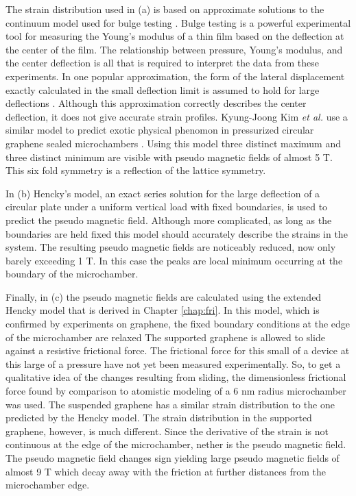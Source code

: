 The strain distribution used in (a) is based on approximate solutions to the continuum model used for bulge testing \cite{Timoshenko}.
Bulge testing is a powerful experimental tool for measuring the Young's modulus of a thin film based on the deflection at the center of the film.
The relationship between pressure, Young's modulus, and the center deflection is all that is required to interpret the data from these experiments.
In one popular approximation, the form of the lateral displacement exactly calculated in the small deflection limit is assumed to hold for large deflections \cite{Timoshenko}. 
Although this approximation correctly describes the center deflection, it does not give accurate strain profiles.
Kyung-Joong Kim \emph{et al.} use a similar model to predict exotic physical phenomon in pressurized circular graphene sealed microchambers \cite{Kim2011b}.
Using this model three distinct maximum and three distinct minimum are visible with pseudo magnetic fields of almost 5 T.
This six fold symmetry is a reflection of the lattice symmetry.

In (b) Hencky's model, an exact series solution for the large deflection of a circular plate under a uniform vertical load with fixed boundaries, is used to predict the pseudo magnetic field.
Although more complicated, as long as the boundaries are held fixed this model should accurately describe the strains in the system.
The resulting pseudo magnetic fields are noticeably reduced, now only barely exceeding 1 T.
In this case the peaks are local minimum occurring at the boundary of the microchamber.

Finally, in (c) the pseudo magnetic fields are calculated using the extended Hencky model that is derived in Chapter \ref{chap:fri}.
In this model, which is confirmed by experiments on graphene, the fixed boundary conditions at the edge of the microchamber are relaxed
The supported graphene is allowed to slide against a resistive frictional force.
The frictional force for this small of a device at this large of a pressure have not yet been measured experimentally.
So, to get a qualitative idea of the changes resulting from sliding, the dimensionless frictional force found by comparison to atomistic modeling of a 6 nm radius microchamber was used.
The suspended graphene has a similar strain distribution to the one predicted by the Hencky model.
The strain distribution in the supported graphene, however, is much different.
Since the derivative of the strain is not continuous at the edge of the microchamber, nether is the pseudo magnetic field.
The pseudo magnetic field changes sign yielding large pseudo magnetic fields of almost 9 T which decay away with the friction at further distances from the microchamber edge.

